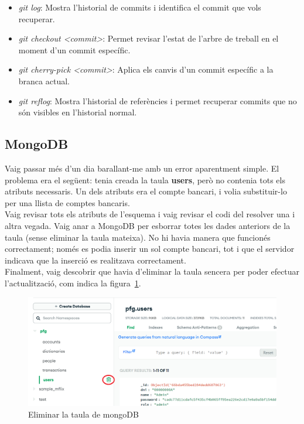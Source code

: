 \documentclass[a4paper,12pt,twoside]{ThesisStyle}
\begin{document}
\begin{itemize}
  \item \textit{git log}: Mostra l'historial de commits i identifica el commit que vols recuperar.
  \item \textit{git checkout <commit>}: Permet revisar l'estat de l'arbre de treball en el moment d'un commit específic.
  \item \textit{git cherry-pick <commit>}: Aplica els canvis d'un commit específic a la branca actual.
  \item \textit{git reflog}: Mostra l'historial de referències i permet recuperar commits que no són visibles en l'historial normal.
\end{itemize}


\subsection{MongoDB}
\label{subsec: MongoDB}

Vaig passar més d'un dia barallant-me amb un error aparentment simple. El problema era el següent: tenia creada la taula \textbf{users}, però no contenia tots els atributs necessaris. Un dels atributs era el compte bancari, i volia substituir-lo per una llista de comptes bancaris.\\

Vaig revisar tots els atributs de l'esquema i vaig revisar el codi del resolver una i altra vegada. Vaig anar a MongoDB per esborrar totes les dades anteriors de la taula (sense eliminar la taula mateixa). No hi havia manera que funcionés correctament; només es podia inserir un sol compte bancari, tot i que el servidor indicava que la inserció es realitzava correctament.\\

Finalment, vaig descobrir que havia d'eliminar la taula sencera per poder efectuar l'actualització, com indica la figura~\ref{fig: Eliminar la taula de mongoDB}.


\begin{figure}[h]
    \centering
    \includegraphics[width=1\textwidth]{imatges/eliminarMongo.png}
    \caption{Eliminar la taula de mongoDB}
    \label{fig: Eliminar la taula de mongoDB}
\end{figure}
\end{document}
